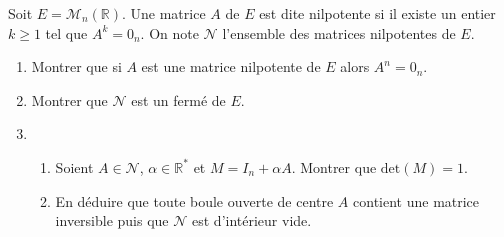 \documentclass[a4paper,10pt]{report}
\begin{document}
\begin{Exercice}{} Soit $E= \mathcal{M}_n(\mathbb{R})$. Une matrice $A$ de $E$ est dite nilpotente si il existe un entier $k\geq 1$ tel que $A^k = 0_n$. On note $\mathcal{N}$ l'ensemble des matrices nilpotentes de $E$.

\begin{enumerate}
\item Montrer que si $A$ est une matrice nilpotente de $E$ alors $A^n=0_n$.
\item Montrer que $\mathcal{N}$ est un fermé de $E$.
\item 
\begin{enumerate}
\item Soient $A \in \mathcal{N}$, $\alpha \in \mathbb{R}^*$ et $M=I_n+ \alpha A$. Montrer que $\textrm{det}(M)=1$.
\item En déduire que toute boule ouverte de centre $A$ contient une matrice inversible puis que $\mathcal{N}$ est d'intérieur vide.
\end{enumerate}
\end{enumerate}
\end{Exercice}

\corr 
\end{document}
